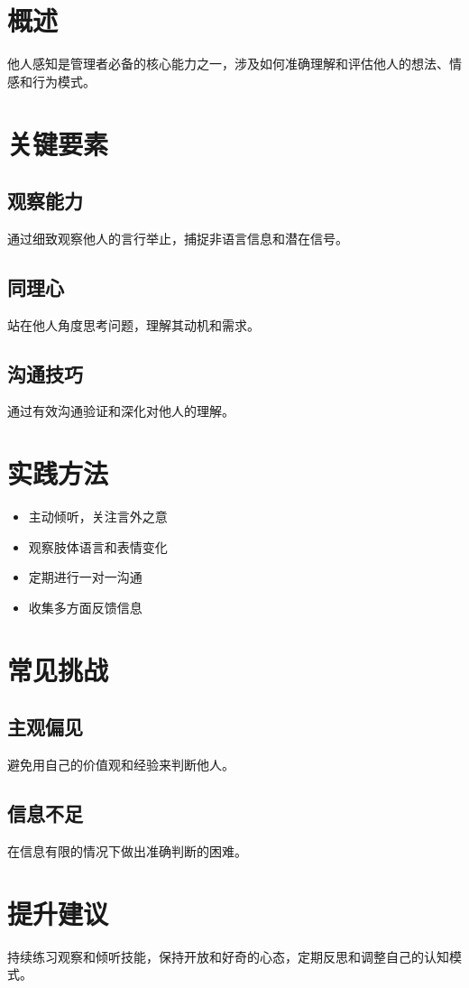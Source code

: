 \section{概述}

他人感知是管理者必备的核心能力之一，涉及如何准确理解和评估他人的想法、情感和行为模式。

\section{关键要素}

\subsection{观察能力}

通过细致观察他人的言行举止，捕捉非语言信息和潜在信号。

\subsection{同理心}

站在他人角度思考问题，理解其动机和需求。

\subsection{沟通技巧}

通过有效沟通验证和深化对他人的理解。

\section{实践方法}

\begin{itemize}
\item 主动倾听，关注言外之意
\item 观察肢体语言和表情变化
\item 定期进行一对一沟通
\item 收集多方面反馈信息
\end{itemize}

\section{常见挑战}

\subsection{主观偏见}

避免用自己的价值观和经验来判断他人。

\subsection{信息不足}

在信息有限的情况下做出准确判断的困难。

\section{提升建议}

持续练习观察和倾听技能，保持开放和好奇的心态，定期反思和调整自己的认知模式。